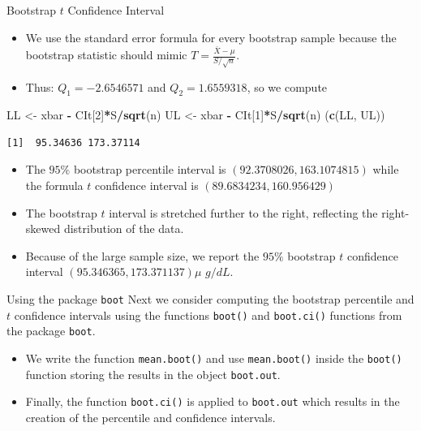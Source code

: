 \documentclass[
  ignorenonframetext,
]{beamer}
\newenvironment{Shaded}{\begin{snugshade}}{\end{snugshade}}
\newcommand{\DecValTok}[1]{\textcolor[rgb]{0.00,0.00,0.81}{#1}}
\newcommand{\FunctionTok}[1]{\textcolor[rgb]{0.13,0.29,0.53}{\textbf{#1}}}
\newcommand{\NormalTok}[1]{#1}
\newcommand{\OtherTok}[1]{\textcolor[rgb]{0.56,0.35,0.01}{#1}}
\newcommand{\SpecialCharTok}[1]{\textcolor[rgb]{0.81,0.36,0.00}{\textbf{#1}}}
\begin{document}
\begin{frame}[fragile]{Bootstrap \(t\) Confidence Interval}
\label{bootstrap-t-confidence-interval-10}
\begin{itemize}
\item
  We use the standard error formula for every bootstrap sample because
  the bootstrap statistic should mimic
  \(T=\frac{\bar{X}-\mu}{S/\sqrt{n}}\).
\item
  Thus: \(Q_1=-2.6546571\) and \(Q_2=1.6559318\), so we compute
\end{itemize}

\small

\begin{Shaded}
\begin{Highlighting}[]
\NormalTok{LL }\OtherTok{\textless{}{-}}\NormalTok{ xbar }\SpecialCharTok{{-}}\NormalTok{ CIt[}\DecValTok{2}\NormalTok{]}\SpecialCharTok{*}\NormalTok{S}\SpecialCharTok{/}\FunctionTok{sqrt}\NormalTok{(n)}
\NormalTok{UL }\OtherTok{\textless{}{-}}\NormalTok{ xbar }\SpecialCharTok{{-}}\NormalTok{ CIt[}\DecValTok{1}\NormalTok{]}\SpecialCharTok{*}\NormalTok{S}\SpecialCharTok{/}\FunctionTok{sqrt}\NormalTok{(n)}
\NormalTok{(}\FunctionTok{c}\NormalTok{(LL, UL))}
\end{Highlighting}
\end{Shaded}

\begin{verbatim}
[1]  95.34636 173.37114
\end{verbatim}

\normalsize

\begin{itemize}
\item
  The \(95\%\) bootstrap percentile interval is
  \((92.3708026, 163.1074815)\) while the formula \(t\) confidence
  interval is \((89.6834234, 160.956429)\)
\item
  The bootstrap \(t\) interval is stretched further to the right,
  reflecting the right-skewed distribution of the data.
\item
  Because of the large sample size, we report the \(95\%\) bootstrap
  \(t\) confidence interval \((95.346365, 173.371137)\mu\) \(g/dL\).
\end{itemize}
\end{frame}

\begin{frame}[fragile]{Using the package \texttt{boot}}
\label{using-the-package-boot}
Next we consider computing the bootstrap percentile and \(t\) confidence
intervals using the functions \texttt{boot()} and \texttt{boot.ci()}
functions from the package \texttt{boot}.

\begin{itemize}
\item
  We write the function \texttt{mean.boot()} and use
  \texttt{mean.boot()} inside the \texttt{boot()} function storing the
  results in the object \texttt{boot.out}.
\item
  Finally, the function \texttt{boot.ci()} is applied to
  \texttt{boot.out} which results in the creation of the percentile and
  confidence intervals.
\end{itemize}
\end{frame}
\end{document}
